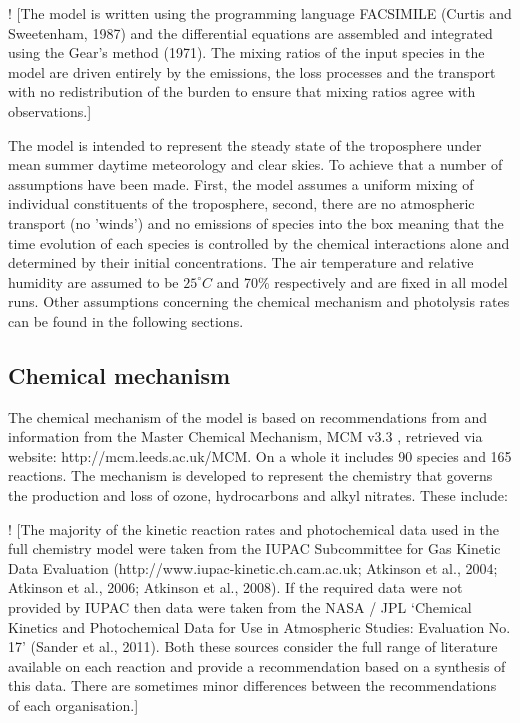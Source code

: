 \documentclass[11pt,a4paper]{article}
\begin{document}
! \citep{Newland2013}
[The model is written using the programming language FACSIMILE (Curtis and Sweetenham, 1987) and the differential equations are assembled and integrated using the Gear’s method (1971). The mixing ratios of the input species in the model are driven entirely by the emissions, the loss processes and the transport with no redistribution of the burden to ensure that mixing ratios agree with observations.]

The model is intended to represent the steady state of the troposphere under mean summer daytime meteorology and clear skies. To achieve that a number of assumptions have been made. First, the model assumes a uniform mixing of individual constituents of the troposphere, second, there are no atmospheric transport (no 'winds') and no emissions of species into the box meaning that the time evolution of each species is controlled by the chemical interactions alone and determined by their initial concentrations. The air temperature and relative humidity are assumed to be $25^{\circ}C$ and 70\% respectively and are fixed in all model runs. Other assumptions concerning the chemical mechanism and photolysis rates can be found in the following sections.

\subsection{Chemical mechanism}\label{sec:chem_mech}
The chemical mechanism of the model is based on recommendations from \citep{Atkinson2004} and information from the Master Chemical Mechanism, MCM v3.3 \citep{Jenkin1997,Saunders2003}, retrieved via website: http://mcm.leeds.ac.uk/MCM. On a whole it includes 90 species and 165 reactions. The mechanism is developed to represent the chemistry that governs the production and loss of ozone, hydrocarbons and alkyl nitrates. These include:

! \citep{Newland2013}
[The majority of the kinetic reaction rates and photochemical data used in the full chemistry model were taken from the IUPAC Subcommittee for Gas Kinetic Data Evaluation (http://www.iupac-kinetic.ch.cam.ac.uk; Atkinson et al., 2004; Atkinson et al., 2006; Atkinson et al., 2008). If the required data were not provided by IUPAC then data were taken from the NASA / JPL ‘Chemical Kinetics and Photochemical Data for Use in Atmospheric Studies: Evaluation No. 17’ (Sander et al., 2011). Both these sources consider the full range of literature available on each reaction and provide a recommendation based on a synthesis of this data. There are sometimes minor differences between the recommendations of each organisation.]
\end{document}
